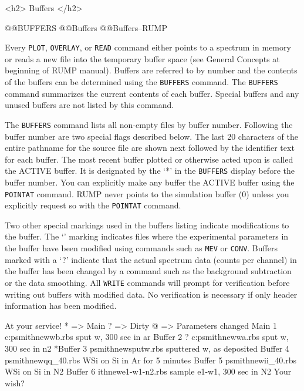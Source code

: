 {<h2> Buffers </h2>


@@{BUFFERS} @@{Buffers} @@{Buffers--RUMP}

Every {\tt PLOT}, {\tt OVERLAY}, or {\tt READ} command either points to a
spectrum in memory or reads a new file into the temporary buffer space (see
General Concepts at beginning of RUMP manual).
Buffers are referred to by number and the contents of the buffers can be
determined using the {\tt BUFFERS} command.  The {\tt BUFFERS} command
summarizes the current contents of each buffer.  Special buffers and any
unused buffers are not listed by this command.

The {\tt BUFFERS} command lists all non-empty files by buffer number.
Following the buffer number are two special flags described below.  The last
20 characters of the entire pathname for the source file are shown next
followed by the identifier text for each buffer.  The most recent buffer
plotted or otherwise acted upon is called the ACTIVE buffer.  It is designated
by the `*' in the {\tt BUFFERS} display before the buffer number.  You can
explicitly make any buffer the ACTIVE buffer using the {\tt POINTAT} command.
RUMP never points to the simulation buffer (0) unless you explicitly request
so with the {\tt POINTAT} command. 

Two other special markings used in the buffers listing indicate
modifications to the buffer.  The `\@' marking indicates files where
the experimental parameters in the buffer have been modified using
commands such as {\tt MEV} or {\tt CONV}.  Buffers marked with a
`?' indicate that the actual spectrum data (counts per channel) in the
buffer has been changed by a command such as the background
subtraction or the data smoothing.  All {\tt WRITE} commands will
prompt for verification before writing out buffers with modified
data.  No verification is necessary if only header information has
been modified.

\medskip\beginscreen
At your service! 
* => Main    ? => Dirty    @ => Parameters changed
  Main    1    c:{\bs}psmith{\bs}new{\bs}wb.rbs  sput w, 300 sec in ar
  Buffer  2 ?  c:{\bs}psmith{\bs}new{\bs}wa.rbs  sput w, 300 sec in n2
 *Buffer  3    psmith{\bs}new{\bs}sputw.rbs  sputtered w, as deposited
  Buffer  4  \@ psmith{\bs}new{\bs}qq\_40.rbs  WSi on Si in Ar for 5 minutes
  Buffer  5    psmith{\bs}new{\bs}ii\_40.rbs  WSi on Si in N2
  Buffer  6    ith{\bs}new{\bs}e1-w1-n2.rbs  sample e1-w1, 300 sec in N2
Your wish? 
\endscreen


}
